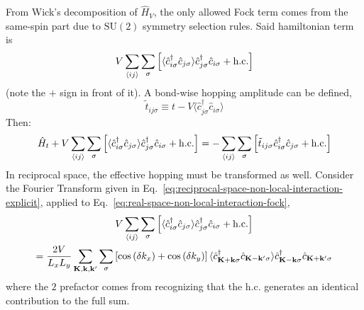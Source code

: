 From Wick's decomposition of $\hat H_V$, the only allowed Fock term comes from the same-spin part due to $\mathrm{SU}(2)$ symmetry selection rules. Said hamiltonian term is
\begin{equation}\label{eq:real-space-non-local-interaction-fock}
	V \sum_{\ev{ij}} \sum_\sigma \left[
		\langle
			\hat c_{i\sigma}^\dagger \hat c_{j\sigma}
		\rangle \hat c_{j\sigma}^\dagger  \hat c_{i\sigma} + \mathrm{h.c.}
	\right]
\end{equation}
(note the $+$ sign in front of it). A bond-wise hopping amplitude can be defined,
\[
	\tilde{t}_{ij\sigma} \equiv t - V \langle
		\hat c_{j\sigma}^\dagger \hat c_{i\sigma}
	\rangle
\]
Then:
\[
	\hat H_t + V \sum_{\ev{ij}} \sum_\sigma \left[
		\langle
			\hat c_{i\sigma}^\dagger \hat c_{j\sigma}
		\rangle \hat c_{j\sigma}^\dagger  \hat c_{i\sigma} + \mathrm{h.c.}
	\right] = - \sum_{\ev{ij}} \sum_\sigma 
	\left[
		\tilde{t}_{ij\sigma} \hat c_{i\sigma}^\dagger \hat c_{j\sigma} + \mathrm{h.c.}
	\right]
\]
In reciprocal space, the effective hopping must be transformed as well. Consider the Fourier Transform given in Eq.~\eqref{eq:reciprocal-space-non-local-interaction-explicit}, applied to Eq.~\eqref{eq:real-space-non-local-interaction-fock},
\begin{multline}
	V \sum_{\ev{ij}} \sum_\sigma \left[
		\langle
			\hat c_{i\sigma}^\dagger \hat c_{j\sigma}
		\rangle \hat c_{j\sigma}^\dagger  \hat c_{i\sigma} + \mathrm{h.c.}
	\right] \\
	= \frac{2V}{L_x L_y} \sum_{\mathbf{K}, \mathbf{k}, \mathbf{k}'} \sum_\sigma \left[
		\cos \left(
			\delta k_x
			\right)	+ \cos \left(
			\delta k_y
		\right)	
	\right]	
	\langle
		\hat c_{\mathbf{K}+\mathbf{k} \sigma}^\dagger 
		\hat c_{\mathbf{K}-\mathbf{k}' \sigma}
	\rangle
	\hat c_{\mathbf{K}-\mathbf{k} \sigma}^\dagger  \hat c_{\mathbf{K}+\mathbf{k}'\sigma} \label{eq:reciprocal-space-non-local-interaction-fock-intermediate}
\end{multline}
where the $2$ prefactor comes from recognizing that the $\mathrm{h.c.}$ generates an identical contribution to the full sum.

